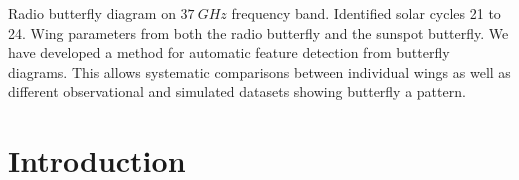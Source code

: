\documentclass{aa}
\begin{document}
  {
    Radio butterfly diagram on $\SI{37}{GHz}$ frequency band.
    Identified solar cycles 21 to 24.
    Wing parameters from both the radio butterfly and the sunspot butterfly.
  }
  {
    We have developed a method for automatic feature detection from butterfly
    diagrams.
    This allows systematic comparisons between individual wings as well as
    different observational and simulated datasets showing butterfly a pattern.
  }


  \maketitle

\section{Introduction}
\end{document}
